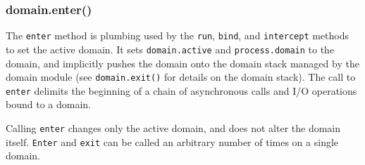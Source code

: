 \begin{Shaded}
\begin{Highlighting}[]
 \NormalTok{();}

 
  \NormalTok{, }\NormalTok{(}

     
  \NormalTok{\}));}
\NormalTok{\}}

\NormalTok{(}\NormalTok{, }
\NormalTok{\});}
\end{Highlighting}
\end{Shaded}

\subsubsection{domain.enter()}

The \texttt{enter} method is plumbing used by the \texttt{run},
\texttt{bind}, and \texttt{intercept} methods to set the active domain.
It sets \texttt{domain.active} and \texttt{process.domain} to the
domain, and implicitly pushes the domain onto the domain stack managed
by the domain module (see \texttt{domain.exit()} for details on the
domain stack). The call to \texttt{enter} delimits the beginning of a
chain of asynchronous calls and I/O operations bound to a domain.

Calling \texttt{enter} changes only the active domain, and does not
alter the domain itself. \texttt{Enter} and \texttt{exit} can be called
an arbitrary number of times on a single domain.


